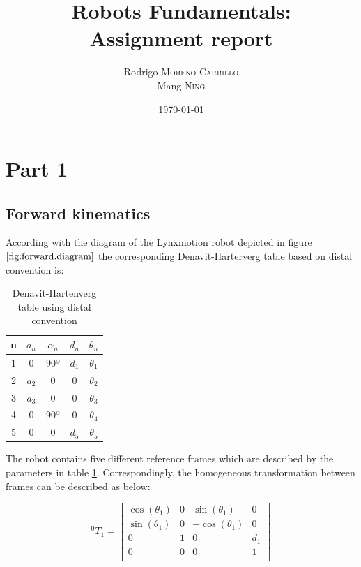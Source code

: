 \documentclass{article}
\title{Robots Fundamentals:\\
Assignment report} %
\author{Rodrigo \textsc{Moreno Carrillo} \\
			Mang \textsc{Ning}} %
\date{\today} %
\renewcommand{\c}[1]{\cos(\theta_{#1})}
\newcommand{\s}[1]{\sin(\theta_{#1})}
\newcommand{\T}[2]{{}^{#1}T_{#2}}
\begin{document}

\maketitle %

\section{Part 1}
\subsection{Forward kinematics} 

According with the diagram of the Lynxmotion robot depicted in figure $\ref{fig:forward.diagram}$ the corresponding Denavit-Harterverg table based on distal convention is:

\begin{table}[h!]
\centering
\begin{tabular}{ c | c c c c}
 n & $a_n$ 	& $\alpha_n$		& $d_n$	& $\theta_n$\\ \hline
 1 & 0 			& 90º				& $d_1$	& $\theta_1$\\  
 2 & $a_2$ 	& 0					& 0			& $\theta_2$\\  
 3 & $a_3$ 	& 0					& 0			& $\theta_3$\\  
 4 & 0 			& 90º				& 0			& $\theta_4$\\  
 5 & 0 			& 0					& $d_5$	& $\theta_5$\\ 
\end{tabular}
\caption{Denavit-Hartenverg table using distal convention}
\label{tab:forward.dh}
\end{table}

The robot contains five different reference frames which are described by the parameters in table \ref{tab:forward.dh}. Correspondingly, the homogeneous transformation between frames can be described as below:

\begin{equation}
\label{eq:forward.t_01}
\T{0}{1} = \left[
\begin{array}{cccc}
	\c{1} & 0 & \s{1} & 0 \\
	\s{1} & 0 & -\c{1} & 0 \\
	0 & 1 & 0 & d_1 \\
	0 & 0 & 0 & 1 \\
\end{array}
\right]
\end{equation}
\end{document}
